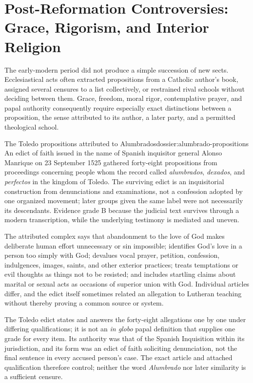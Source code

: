 \section{Post-Reformation Controversies: Grace, Rigorism, and Interior Religion}

The early-modern period did not produce a simple succession of new sects. Ecclesiastical acts often extracted propositions from a Catholic author's book, assigned several censures to a list collectively, or restrained rival schools without deciding between them. Grace, freedom, moral rigor, contemplative prayer, and papal authority consequently require especially exact distinctions between a proposition, the sense attributed to its author, a later party, and a permitted theological school.

\begin{heresydossier}{The Toledo propositions attributed to Alumbrados}{dossier:alumbrado-propositions}
\objectfield An edict of faith issued in the name of Spanish inquisitor general Alonso Manrique on 23 September 1525 gathered forty-eight propositions from proceedings concerning people whom the record called \emph{alumbrados}, \emph{dexados}, and \emph{perfectos} in the kingdom of Toledo. The surviving edict is an inquisitorial construction from denunciations and examinations, not a confession adopted by one organized movement; later groups given the same label were not necessarily its descendants. Evidence grade B because the judicial text survives through a modern transcription, while the underlying testimony is mediated and uneven.

\propositionfield The attributed complex says that abandonment to the love of God makes deliberate human effort unnecessary or sin impossible; identifies God's love in a person too simply with God; devalues vocal prayer, petition, confession, indulgences, images, saints, and other exterior practices; treats temptations or evil thoughts as things not to be resisted; and includes startling claims about marital or sexual acts as occasions of superior union with God. Individual articles differ, and the edict itself sometimes related an allegation to Lutheran teaching without thereby proving a common source or system.

\responsefield The Toledo edict states and answers the forty-eight allegations one by one under differing qualifications; it is not an \emph{in globo} papal definition that supplies one grade for every item. Its authority was that of the Spanish Inquisition within its jurisdiction, and its form was an edict of faith soliciting denunciation, not the final sentence in every accused person's case. The exact article and attached qualification therefore control; neither the word \emph{Alumbrado} nor later similarity is a sufficient censure.


\end{heresydossier}
